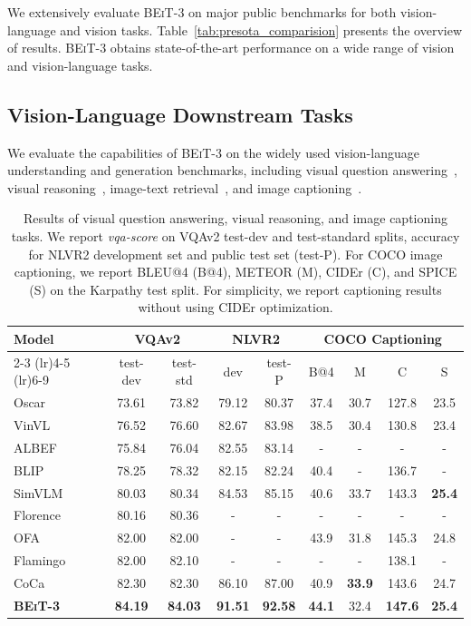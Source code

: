 \documentclass{article}
\newcommand\our{\textsc{BEiT-3}}
\begin{document}
We extensively evaluate \our{} on major public benchmarks for both vision-language and vision tasks.
Table~\ref{tab:presota_comparision} presents the overview of results. 
\our{} obtains state-of-the-art performance on a wide range of vision and vision-language tasks.


\subsection{Vision-Language Downstream Tasks}

We evaluate the capabilities of \our{} on the widely used vision-language understanding and generation benchmarks, including visual question answering~\citep{vqa}, visual reasoning~\citep{nlvr2}, image-text retrieval~\citep{flickr30k,coco}, and image captioning~\citep{coco}.


\begin{table}[t]
\centering
\begin{tabular}{@{}lcccccccc@{}}
\toprule
\multirow{2}{*}{\bf Model} & \multicolumn{2}{c}{\bf VQAv2} & \multicolumn{2}{c}{\bf NLVR2} & \multicolumn{4}{c}{\bf COCO Captioning} \\
\cmidrule(lr){2-3} \cmidrule(lr){4-5} \cmidrule(lr){6-9}
 & test-dev & test-std & dev & test-P & B@4 & M & C & S \\
\midrule
Oscar~\citep{oscar} & 73.61 & 73.82 & 79.12 & 80.37 & 37.4 & 30.7 & 127.8 & 23.5 \\
VinVL~\citep{vinvl} & 76.52 & 76.60 & 82.67 & 83.98 & 38.5 & 30.4 & 130.8 & 23.4 \\
ALBEF~\citep{albef} & 75.84 & 76.04 & 82.55 & 83.14 & - & - & - & - \\
BLIP~\citep{blip} & 78.25 & 78.32 & 82.15 & 82.24 & 40.4 & - & 136.7 & - \\
SimVLM~\citep{simvlm} & 80.03 & 80.34 & 84.53 & 85.15 & 40.6 & 33.7 & 143.3 & \bf 25.4 \\
Florence~\citep{florence} & 80.16 & 80.36 & - & - & - & - & - & - \\
OFA~\citep{ofa} & 82.00 & 82.00 & - & - & 43.9 & 31.8 & 145.3 & 24.8 \\
Flamingo~\citep{flamingo} & 82.00 & 82.10 & - & - & - & - & 138.1 & - \\
CoCa~\citep{coca} & 82.30 & 82.30 & 86.10 & 87.00 & 40.9 & \bf 33.9 & 143.6 & 24.7 \\
\midrule
\bf \our{} & \bf 84.19 & \bf 84.03 & \bf 91.51 & \bf 92.58 & \bf 44.1 & 32.4 & \bf 147.6 & \bf 25.4 \\
\bottomrule
\end{tabular}
\caption{Results of visual question answering, visual reasoning, and image captioning tasks.
We report \textit{vqa-score} on VQAv2 test-dev and test-standard splits, accuracy for NLVR2 development set and public test set (test-P).
For COCO image captioning, we report BLEU@4 (B@4), METEOR (M), CIDEr (C), and SPICE (S) on the Karpathy test split.
For simplicity, we report captioning results without using CIDEr optimization.
}
\label{tbl:results:vqa_nlvr2_captioning}
\end{table}
\end{document}
